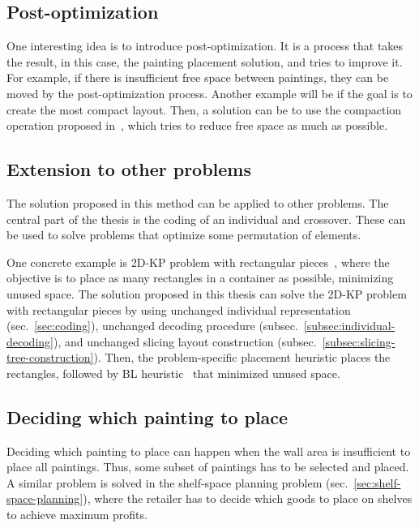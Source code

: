 \subsection{Post-optimization}\label{subsec:post-optimization}

One interesting idea is to introduce post-optimization.
It is a process that takes the result, in this case, the painting placement solution,
and tries to improve it.
For example, if there is insufficient free space between paintings, they can be moved by the post-optimization process.
Another example will be if the goal is to create the most compact layout.
Then, a solution can be to use the compaction operation proposed in~\cite{laiSlicingTreeComplete2001},
which tries to reduce free space as much as possible.

\subsection{Extension to other problems}\label{subsec:extension-to-other-problems}

The solution proposed in this method can be applied to other problems.
The central part of the thesis is the coding of an individual and crossover.
These can be used to solve problems that optimize some permutation of elements.

One concrete example is 2D-KP problem with rectangular pieces~\cite{bortfeldtGeneticAlgorithmTwodimensional2009},
where the objective is to place as many rectangles in a container as possible,
minimizing unused space.
The solution proposed in this thesis can solve the 2D-KP problem with rectangular pieces by
using unchanged individual representation (sec.~\ref{sec:coding}), unchanged decoding procedure (subsec.~\ref{subsec:individual-decoding}),
and unchanged slicing layout construction (subsec.~\ref{subsec:slicing-tree-construction}).
Then, the problem-specific placement heuristic places the rectangles,
followed by BL heuristic~\cite{chazelleBottomnLeftBinPackingHeuristic1983} that minimized unused space.

\subsection{Deciding which painting to place}\label{subsec:deciding-which-painting-to-place}
Deciding which painting to place can happen when the wall area is insufficient to place all paintings.
Thus, some subset of paintings has to be selected and placed.
A similar problem is solved in the shelf-space planning problem (sec.~\ref{sec:shelf-space-planning}),
where the retailer has to decide which goods to place on shelves to achieve maximum profits.


